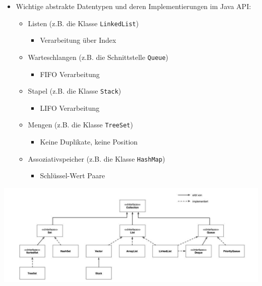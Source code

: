 \documentclass[a4paper,10pt, dvipsnames]{report}
\newcommand{\javaInLine}[1]{\texttt{#1}}
\begin{document}
\begin{itemize}
	\item Wichtige abstrakte Datentypen und deren Implementierungen im Java API:
	\begin{itemize}
        \item Listen (z.B. die Klasse \javaInLine{LinkedList})
        \begin{itemize}
            \item Verarbeitung über Index
        \end{itemize}
        \item Warteschlangen (z.B. die Schnittstelle \javaInLine{Queue})
        \begin{itemize}
            \item FIFO Verarbeitung
        \end{itemize}
        \item Stapel (z.B. die Klasse \javaInLine{Stack})
        \begin{itemize}
            \item LIFO Verarbeitung
        \end{itemize}
        \item Mengen (z.B. die Klasse \javaInLine{TreeSet})
        \begin{itemize}
            \item Keine Duplikate, keine Position
        \end{itemize}
        \item Assoziativspeicher (z.B. die Klasse \javaInLine{HashMap})
        \begin{itemize}
            \item Schlüssel-Wert Paare
        \end{itemize}
    \end{itemize}
\end{itemize}

\begin{center}
    \includegraphics[width=\linewidth]{resources/CollectionFramework.jpg}
\end{center}
\end{document}
